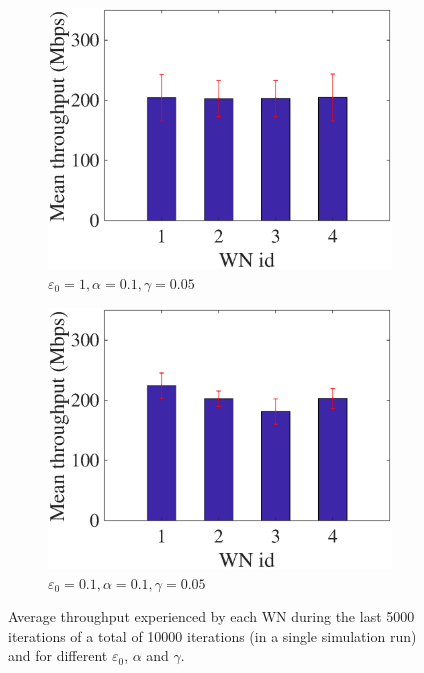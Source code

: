 \documentclass[conference]{IEEEtran}
\begin{document}
\begin{figure}[h!]
\begin{subfigure}[b]{0.225\textwidth}
			\includegraphics[width=\textwidth]{images/e_1_a_01_g_005_avg_tpt}
			\caption{$\varepsilon_0=1, \alpha=0.1, \gamma=0.05$}
			\label{fig:e_1_a_0.1_g_0.05_avg_tpt}
		\end{subfigure}
		\begin{subfigure}[b]{0.225\textwidth}
			\includegraphics[width=\textwidth]{images/e_01_a_01_g_005_avg_tpt}
			\caption{$\varepsilon_0=0.1, \alpha=0.1, \gamma=0.05$}
			\label{fig:e_0.1_a_0.1_g_0.05_avg_tpt}
		\end{subfigure}
		\caption{Average throughput experienced by each WN during the last 5000 iterations of a total of 10000 iterations (in a single simulation run) and for different $\varepsilon_0$, $\alpha$ and $\gamma$.}
		\label{fig:ql_params_eval_average_tpt}
	\end{figure}
	
\end{document}
